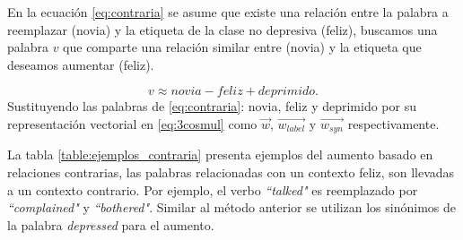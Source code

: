 En la ecuación \ref{eq:contraria} se asume que existe una relación entre la palabra a reemplazar (novia) y la etiqueta de la clase no depresiva (feliz), buscamos una palabra $v$ que comparte una relación similar entre (novia) y la etiqueta que deseamos aumentar (feliz).

\begin{equation}
    \label{eq:contraria}
    v \approx novia - feliz + deprimido.
\end{equation}
Sustituyendo las palabras de \ref{eq:contraria}: novia, feliz y deprimido por su representación vectorial en \ref{eq:3cosmul} como $\vec{w}$, $\vec{w_{label}}$ y $\vec{w_{syn}}$ respectivamente.
 

La tabla \ref{table:ejemplos_contraria} presenta ejemplos del aumento basado en relaciones contrarias, las palabras relacionadas con un contexto feliz, son llevadas a un contexto contrario. Por ejemplo, el verbo \textit{``talked"} es reemplazado por \textit{``complained"} y \textit{``bothered"}. Similar al método anterior se utilizan los sinónimos de la palabra \textit{depressed} para el aumento.

